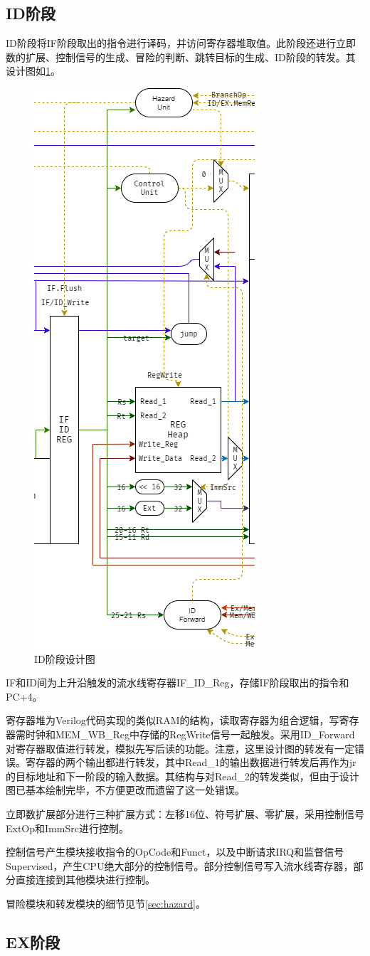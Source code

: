 \documentclass[a4paper]{article}
\begin{document}
\subsection{ID阶段}

ID阶段将IF阶段取出的指令进行译码，并访问寄存器堆取值。此阶段还进行立即数的扩展、控制信号的生成、冒险的判断、跳转目标的生成、ID阶段的转发。其设计图如\ref{fig:ID_design}。

\begin{figure}[htb]
    \centering
    \includegraphics[width=.25\textwidth]{../assets/design_ID.png}
    \caption{ID阶段设计图}
    \label{fig:ID_design}
\end{figure}

IF和ID间为上升沿触发的流水线寄存器IF\_ID\_Reg，存储IF阶段取出的指令和PC+4。

寄存器堆为Verilog代码实现的类似RAM的结构，读取寄存器为组合逻辑，写寄存器需时钟和MEM\_WB\_Reg中存储的RegWrite信号一起触发。采用ID\_Forward对寄存器取值进行转发，模拟先写后读的功能。注意，这里设计图的转发有一定错误。寄存器的两个输出都进行转发，其中Read\_1的输出数据进行转发后再作为jr的目标地址和下一阶段的输入数据。其结构与对Read\_2的转发类似，但由于设计图已基本绘制完毕，不方便更改而遗留了这一处错误。

立即数扩展部分进行三种扩展方式：左移16位、符号扩展、零扩展，采用控制信号ExtOp和ImmSrc进行控制。

控制信号产生模块接收指令的OpCode和Funct，以及中断请求IRQ和监督信号Supervised，产生CPU绝大部分的控制信号。部分控制信号写入流水线寄存器，部分直接连接到其他模块进行控制。

冒险模块和转发模块的细节见节\ref{sec:hazard}。

\subsection{EX阶段}
\end{document}
